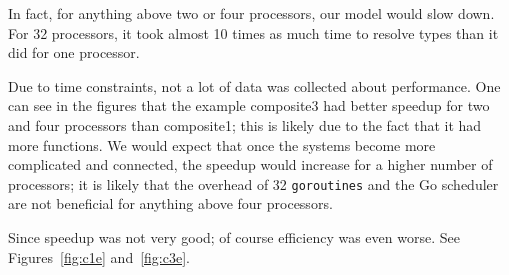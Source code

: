 \documentclass{acm_proc_article-sp}
\begin{document}
In fact, for anything above two or four processors, our model would slow down.
For 32 processors, it took almost 10 times as much time to resolve types than
it did for one processor.

Due to time constraints, not a lot of data was collected about performance. One
can see in the figures that the example composite3 had better speedup for two
and four processors than composite1; this is likely due to the fact that it had
more functions. We would expect that once the systems become more complicated
and connected, the speedup would increase for a higher number of processors; it
is likely that the overhead of 32 \texttt{goroutines} and the Go scheduler are
not beneficial for anything above four processors.

Since speedup was not very good; of course efficiency was even worse. See
Figures~\ref{fig:c1e} and~\ref{fig:c3e}.
\end{document}
